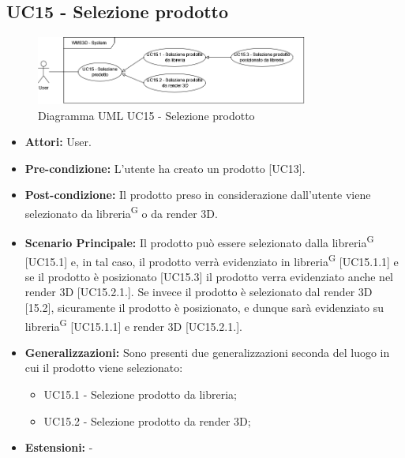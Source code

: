 \subsection{UC15 - Selezione prodotto}
\begin{figure}[H]
  \centering
  \includegraphics[width=0.8\textwidth]{UC_diagrams_11-20/UC15_sys.drawio.png}
   \caption{Diagramma UML UC15 - Selezione prodotto}
\end{figure}
\begin{itemize}
    \item \textbf{Attori:} User.
    \item \textbf{Pre-condizione:}  L'utente ha creato un prodotto [UC13].
    \item \textbf{Post-condizione:} Il prodotto preso in considerazione dall'utente viene selezionato da libreria\textsuperscript{G} o da render 3D.
    \item \textbf{Scenario Principale:} Il prodotto può essere selezionato dalla libreria\textsuperscript{G} [UC15.1] e, in tal caso, il prodotto verrà evidenziato in libreria\textsuperscript{G} [UC15.1.1] e se il prodotto è posizionato [UC15.3] il prodotto verra evidenziato anche nel render 3D [UC15.2.1.]. Se invece il prodotto è selezionato dal render 3D [15.2], sicuramente il prodotto è posizionato, e dunque sarà evidenziato su libreria\textsuperscript{G} [UC15.1.1] e render 3D [UC15.2.1.].
    \item \textbf{Generalizzazioni:} Sono presenti due generalizzazioni seconda del luogo in cui il prodotto viene selezionato:
    \begin{itemize}
        \item UC15.1 - Selezione prodotto da libreria;
        \item UC15.2 - Selezione prodotto da render 3D;
    \end{itemize}
    \item \textbf{Estensioni:} -
\end{itemize}



